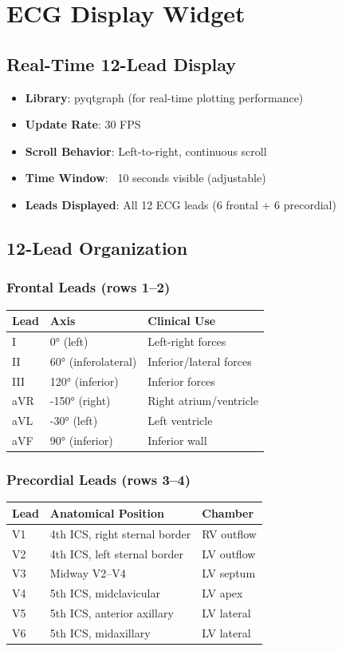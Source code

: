 \documentclass[11pt, a4paper]{article}
\begin{document}
\section{ECG Display Widget}

\subsection{Real-Time 12-Lead Display}
\begin{itemize}
    \item \textbf{Library}: pyqtgraph (for real-time plotting performance)
    \item \textbf{Update Rate}: 30 FPS
    \item \textbf{Scroll Behavior}: Left-to-right, continuous scroll
    \item \textbf{Time Window}: ~10 seconds visible (adjustable)
    \item \textbf{Leads Displayed}: All 12 ECG leads (6 frontal + 6 precordial)
\end{itemize}

\subsection{12-Lead Organization}

\subsubsection{Frontal Leads (rows 1--2)}
\begin{tabularx}{\textwidth}{|X|X|X|}
\hline
\textbf{Lead} & \textbf{Axis} & \textbf{Clinical Use} \\
\hline
I & 0° (left) & Left-right forces \\
II & 60° (inferolateral) & Inferior/lateral forces \\
III & 120° (inferior) & Inferior forces \\
aVR & -150° (right) & Right atrium/ventricle \\
aVL & -30° (left) & Left ventricle \\
aVF & 90° (inferior) & Inferior wall \\
\hline
\end{tabularx}

\subsubsection{Precordial Leads (rows 3--4)}
\begin{tabularx}{\textwidth}{|X|X|X|}
\hline
\textbf{Lead} & \textbf{Anatomical Position} & \textbf{Chamber} \\
\hline
V1 & 4th ICS, right sternal border & RV outflow \\
V2 & 4th ICS, left sternal border & LV outflow \\
V3 & Midway V2--V4 & LV septum \\
V4 & 5th ICS, midclavicular & LV apex \\
V5 & 5th ICS, anterior axillary & LV lateral \\
V6 & 5th ICS, midaxillary & LV lateral \\
\hline
\end{tabularx}
\end{document}
